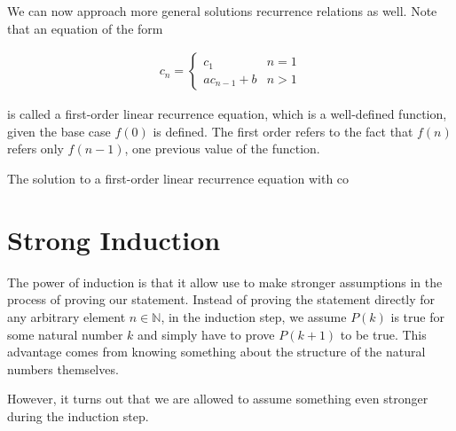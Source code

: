 \documentclass[twoside]{report}
\begin{document}
We can now approach more general solutions recurrence relations as well. Note that an equation of the form

\begin{align*}
	c_n =
	\begin{cases}
		c_1 & n = 1 \\
		a c_{n - 1} + b & n > 1
	\end{cases}
\end{align*}

is called a first-order linear recurrence equation, which is a well-defined function, given the base case $f(0)$ is defined. The first order refers to the fact that $f(n)$ refers only $f(n - 1)$, one previous value of the function.

\vspace{\baselineskip}
\begin{theorem}
	The solution to a first-order linear recurrence equation with co
\end{theorem}

\section{Strong Induction}


The power of induction is that it allow use to make stronger assumptions in the process of proving our statement. Instead of proving the statement directly for any arbitrary element $n \in \mathbb{N}$, in the induction step, we assume $P(k)$ is true for some natural number $k$ and simply have to prove $P(k + 1)$ to be true. This advantage comes from knowing something about the structure of the natural numbers themselves.

However, it turns out that we are allowed to assume something even stronger during the induction step.
\end{document}
